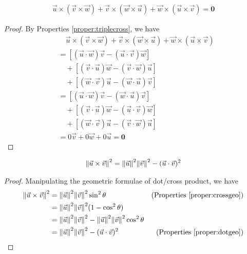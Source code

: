 \begin{proper}
\begin{align*}
\vec{u} \times (\vec{v} \times \vec{w}) + \vec{v} \times (\vec{w} \times \vec{u}) + \vec{w} \times (\vec{u} \times \vec{v}) = \textbf{0}    
\end{align*}
\end{proper}
\begin{proof}
By Properties \ref{proper:triplecross}, we have
\begin{align*}
&\quad \vec{u} \times (\vec{v} \times \vec{w}) + \vec{v} \times (\vec{w} \times \vec{u}) + \vec{w} \times (\vec{u} \times \vec{v}) \\
&= [(\vec{u} \cdot \vec{w})\vec{v} - (\vec{u} \cdot \vec{v})\vec{w}] \\
&\quad + [(\vec{v} \cdot \vec{u})\vec{w} - (\vec{v} \cdot \vec{w})\vec{u}] \\
&\quad + [(\vec{w} \cdot \vec{v})\vec{u} - (\vec{w} \cdot \vec{u})\vec{v}] \\
&= [(\vec{u} \cdot \vec{w})\vec{v} - (\vec{w} \cdot \vec{u})\vec{v}] \\
&\quad + [(\vec{v} \cdot \vec{u})\vec{w} - (\vec{u} \cdot \vec{v})\vec{w}] \\
&\quad + [(\vec{w} \cdot \vec{v})\vec{u} - (\vec{v} \cdot \vec{w})\vec{u}] \\
&= 0\vec{v} + 0\vec{w} + 0\vec{u} = \textbf{0}
\end{align*}
\end{proof}

\begin{proper}
\begin{align*}
\norm{\vec{u} \times \vec{v}}^2 = \norm{\vec{u}}^2 \norm{\vec{v}}^2 - (\vec{u} \cdot \vec{v})^2
\end{align*}
\end{proper}
\begin{proof}
Manipulating the geometric formulae of dot/cross product, we have
\begin{align*}
\norm{\vec{u} \times \vec{v}}^2 &= \norm{\vec{u}}^2 \norm{\vec{v}}^2 \sin^2 \theta  &\text{(Properties \ref{proper:crossgeo})} \\
&= \norm{\vec{u}}^2 \norm{\vec{v}}^2 (1 - \cos^2 \theta) \\
&= \norm{\vec{u}}^2 \norm{\vec{v}}^2 - \norm{\vec{u}}^2 \norm{\vec{v}}^2 \cos^2 \theta \\
&= \norm{\vec{u}}^2 \norm{\vec{v}}^2 - (\vec{u} \cdot \vec{v})^2 &\text{(Properties \ref{proper:dotgeo})}
\end{align*}
\end{proof}

